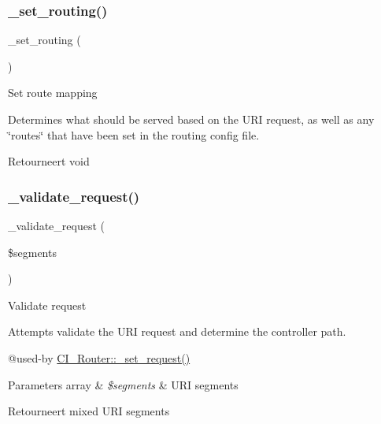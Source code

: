 \subsubsection{\texorpdfstring{\_set\_routing()}{\_set\_routing()}}
{\footnotesize\ttfamily \+\_\+set\+\_\+routing (\begin{DoxyParamCaption}{ }\end{DoxyParamCaption})\hspace{0.3cm}{\ttfamily [protected]}}

Set route mapping

Determines what should be served based on the U\+RI request, as well as any \char`\"{}routes\char`\"{} that have been set in the routing config file.

\begin{DoxyReturn}{Retourneert}
void 
\end{DoxyReturn}
\mbox{\label{class_c_i___router_a488aa4aaa52c36c4e6c791e7bfd76358}} 
\subsubsection{\texorpdfstring{\_validate\_request()}{\_validate\_request()}}
{\footnotesize\ttfamily \+\_\+validate\+\_\+request (\begin{DoxyParamCaption}\item[{}]{\$segments }\end{DoxyParamCaption})\hspace{0.3cm}{\ttfamily [protected]}}

Validate request

Attempts validate the U\+RI request and determine the controller path.

@used-\/by \mbox{\hyperlink{class_c_i___router_a92b8b486926e4dea5fee4d71f80a472a}{C\+I\+\_\+\+Router\+::\+\_\+set\+\_\+request()}} 
\begin{DoxyParams}[1]{Parameters}
array & {\em \$segments} & U\+RI segments \\
\hline
\end{DoxyParams}
\begin{DoxyReturn}{Retourneert}
mixed U\+RI segments 
\end{DoxyReturn}
\mbox{\label{class_c_i___router_af5586c3f514021e9e2588e102620d237}} 
